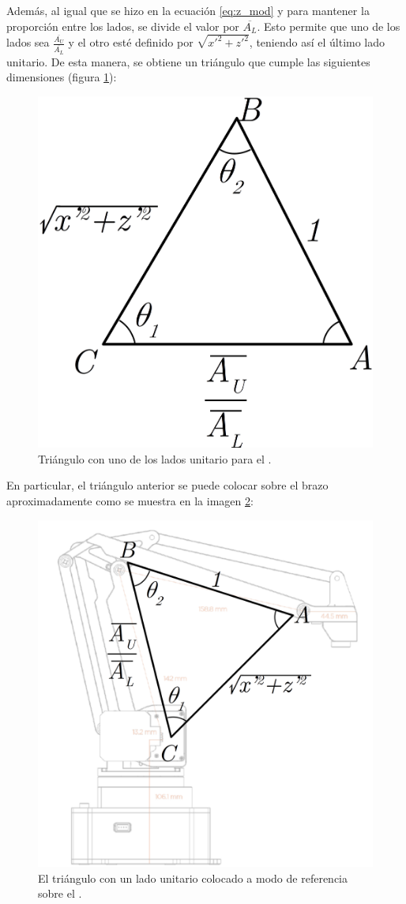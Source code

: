Además, al igual que se hizo en la ecuación \ref{eq:z_mod} y para mantener la proporción
entre los lados, se divide el valor por $\overline{A_L}$. Esto permite que uno de los
lados sea $\frac{\overline{A_U}}{\overline{A_L}}$ y el otro esté definido por
$\sqrt{x'^2 + z'^2}$, teniendo así el último lado unitario.
De esta manera, se obtiene un triángulo que cumple las siguientes dimensiones 
(figura \ref{fig:unitary_triangle}):

\begin{figure}[H]
    \centering
    \includegraphics[width=.3\linewidth]{pictures/ik_unitary_triangle.png}
    \caption{Triángulo con uno de los lados unitario para el \pArm{}.}
    \label{fig:unitary_triangle}
\end{figure}

En particular, el triángulo anterior se puede colocar sobre el brazo aproximadamente
como se muestra en la imagen \ref{fig:u_triangle_over_arm}:

\begin{figure}[H]
    \centering
    \includegraphics[width=.6\linewidth]{pictures/ik_triangle_over_arm.png}
    \caption{El triángulo con un lado unitario colocado a modo de referencia sobre el \pArm{}.}
    \label{fig:u_triangle_over_arm}
\end{figure}

